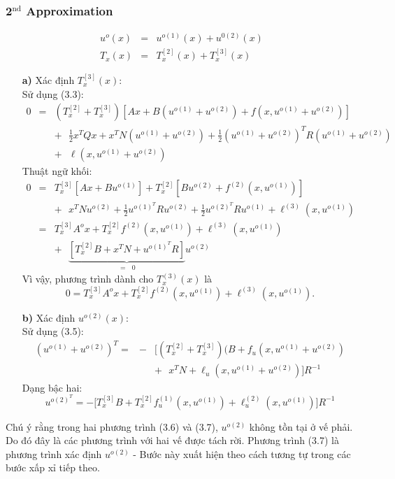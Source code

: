 \documentclass[12pt,a4paper]{report}
\begin{document}
\subsubsection{2$^\text{nd}$ Approximation}
\begin{eqnarray}
	u^o(x) &=& u^{o(1)}(x) + u^{0(2)}(x)\nonumber \\ T_x(x) &=& T_x^{[2]}(x) + T_x^{[3]}(x) \nonumber
\end{eqnarray}
\begin{itemize}
	\item[\textbf{a)}] Xác định $T_x^{[3]}(x)$: \\ Sử dụng (3.3): \begin{eqnarray}
		0 &=& (T_x^{[2]} + T_x^{[3]})[Ax + B(u^{o(1)} + u^{o(2)}) + f(x, u^{o(1)} + u^{o(2)})] \nonumber \\ && + \text{ } \frac{1}{2}x^TQx + x^TN(u^{o(1)} + u^{o(2)}) + \frac{1}{2}(u^{o(1)} + u^{o(2)})^TR(u^{o(1)} + u^{o(2)}) \nonumber \\ && +\text{ } \ell(x, u^{o(1)} + u^{o(2)}) \nonumber
	\end{eqnarray} Thuật ngữ khối: \begin{eqnarray}
		0 &=& T_x^{[3]}[Ax+Bu^{o(1)}] + T_x^{[2]}[Bu^{o(2)}+f^{(2)}(x, u^{o(1)})] \nonumber \\ && + \text{ } x^TNu^{o(2)} + \frac{1}{2}u^{o(1)^T}Ru^{o(2)} + \frac{1}{2}u^{o(2)^T}Ru^{o(1)} + \ell^{(3)}(x, u^{o(1)}) \nonumber \\ &=& T_x^{[3]}A^ox + T_x^{[2]}f^{(2)}(x, u^{o(1)}) + \ell^{(3)}(x, u^{o(1)}) \nonumber \\ && + \text{ } \underbrace{[T_x^{[2]}B + x^TN + u^{o(1)^T}R]}_{= \text{ } 0}u^{o(2)} \nonumber
	\end{eqnarray}
	 Vì vậy, phương trình dành cho $T_x^{(3)}(x)$ là \begin{equation}
	 	0 = T_x^{[3]}A^ox + T_x^{[2]}f^{(2)}(x, u^{o(1)}) + \ell^{(3)}(x, u^{o(1)}).
	 \end{equation}
\item[\textbf{b)}] Xác định $u^{o(2)}(x)$:\\
Sử dụng (3.5): \begin{eqnarray}
	(u^{o(1)} + u^{o(2)})^T = &-& \Big[(T_x^{[2]} + T_x^{[3]})(B+f_u(x, u^{o(1)} + u^{o(2)}) \nonumber \\ && + \text{ } x^TN + \ell_u(x, u^{o(1)} + u^{o(2)})\Big]R^{-1} \nonumber
\end{eqnarray}
Dạng bậc hai: \begin{equation}
	u^{o(2)^T} = - \Big[T_x^{[3]}B + T_x^{[2]}f_u^{(1)}(x, u^{o(1)}) + \ell_u^{(2)}(x, u^{o(1)})\Big]R^{-1}
\end{equation}
\end{itemize}
Chú ý rằng trong hai phương trình (3.6) và (3.7), $u^{o(2)}$ không tồn tại ở vế phải. Do đó đây là các phương trình với hai vế được tách rời. Phương trình (3.7) là phương trình xác định $u^{o(2)}$ - Bước này xuất hiện theo cách tương tự trong các bước xấp xỉ tiếp theo. 
\end{document}
